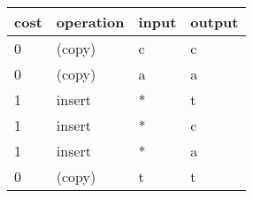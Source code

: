 \documentclass[aspectratio=169]{beamer}
\begin{document}
\begin{frame}[shrink=15]
\vfill

\bigskip

\begin{tabular}{ll||l|l}
cost & operation & input & output\\\hline\hline
0 & (copy)  &c&c\\\hline
0 & (copy)  &a&a\\\hline
1 & insert  &*&t\\\hline
1 & insert  &*&c\\\hline
1 & insert  &*&a\\\hline
0 & (copy)  &t&t\\\hline

\end{tabular}
\end{frame}

\begin{frame}[shrink=15]

\bigskip


\end{frame}
\end{document}
